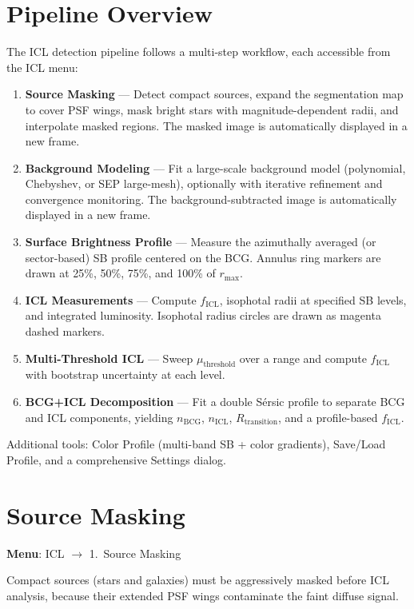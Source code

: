 \documentclass[11pt,fleqn]{book}
\begin{document}
\section{Pipeline Overview}

The ICL detection pipeline follows a multi-step workflow, each accessible from the ICL menu:

\begin{enumerate}[leftmargin=2em]
  \item \textbf{Source Masking} --- Detect compact sources, expand the segmentation map to cover PSF wings, mask bright stars with magnitude-dependent radii, and interpolate masked regions.  The masked image is automatically displayed in a new frame.
  \item \textbf{Background Modeling} --- Fit a large-scale background model (polynomial, Chebyshev, or SEP large-mesh), optionally with iterative refinement and convergence monitoring.  The background-subtracted image is automatically displayed in a new frame.
  \item \textbf{Surface Brightness Profile} --- Measure the azimuthally averaged (or sector-based) SB profile centered on the BCG.  Annulus ring markers are drawn at 25\%, 50\%, 75\%, and 100\% of $r_\mathrm{max}$.
  \item \textbf{ICL Measurements} --- Compute $f_\mathrm{ICL}$, isophotal radii at specified SB levels, and integrated luminosity.  Isophotal radius circles are drawn as magenta dashed markers.
  \item \textbf{Multi-Threshold ICL} --- Sweep $\mu_\mathrm{threshold}$ over a range and compute $f_\mathrm{ICL}$ with bootstrap uncertainty at each level.
  \item \textbf{BCG+ICL Decomposition} --- Fit a double S\'ersic profile to separate BCG and ICL components, yielding $n_\mathrm{BCG}$, $n_\mathrm{ICL}$, $R_\mathrm{transition}$, and a profile-based $f_\mathrm{ICL}$.
\end{enumerate}

Additional tools: Color Profile (multi-band SB + color gradients), Save/Load Profile, and a comprehensive Settings dialog.

\section{Source Masking}
\label{sec:icl-mask}

\textbf{Menu}: ICL $\to$ 1.\ Source Masking

Compact sources (stars and galaxies) must be aggressively masked before ICL analysis, because their extended PSF wings contaminate the faint diffuse signal.
\end{document}
